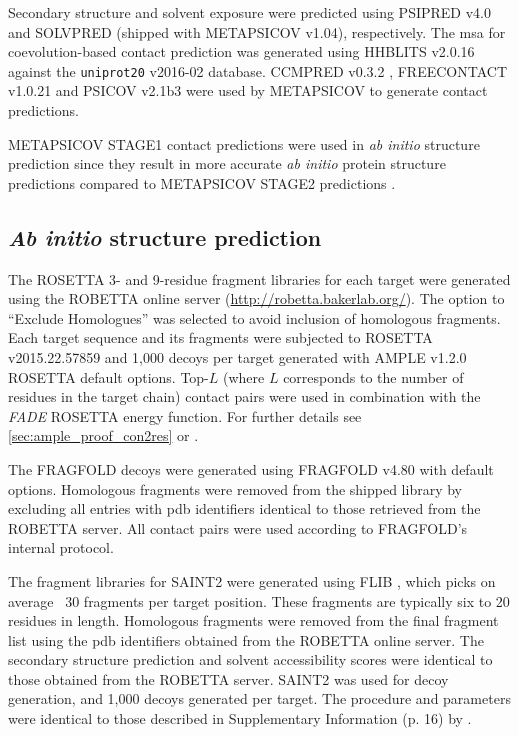 Secondary structure and solvent exposure were predicted using PSIPRED v4.0 \cite{Jones1999-ed} and SOLVPRED (shipped with METAPSICOV v1.04), respectively. The \gls{msa} for coevolution-based contact prediction was generated using HHBLITS v2.0.16 \cite{Remmert2011-kt} against the \texttt{uniprot20} v2016-02 database. CCMPRED v0.3.2 \cite{Seemayer2014-zp}, FREECONTACT v1.0.21 \cite{Kajan2014-bx} and PSICOV v2.1b3 \cite{Jones2012-ks} were used by METAPSICOV to generate contact predictions.

METAPSICOV STAGE1 contact predictions were used in \textit{ab initio} structure prediction since they result in more accurate \textit{ab initio} protein structure predictions compared to METAPSICOV STAGE2 predictions \cite{Jones2015-vq}.

\subsection{\textit{Ab initio} structure prediction} \label{sec:ample_saint2_modelling}
The ROSETTA 3- and 9-residue fragment libraries for each target were generated using the ROBETTA online server (\url{http://robetta.bakerlab.org/}). The option to ``Exclude Homologues'' was selected to avoid inclusion of homologous fragments. Each target sequence and its fragments were subjected to ROSETTA v2015.22.57859 \cite{Rohl2004-dj} and 1,000 decoys per target generated with AMPLE v1.2.0 ROSETTA default options. Top-$L$ (where $L$ corresponds to the number of residues in the target chain) contact pairs were used in combination with the \textit{FADE} ROSETTA energy function. For further details see \cref{sec:ample_proof_con2res} or \textcite{Michel2014-eg}.

The FRAGFOLD decoys were generated using FRAGFOLD v4.80 \cite{Jones2001-mc} with default options. Homologous fragments were removed from the shipped library  by excluding all entries with \gls{pdb} identifiers identical to those retrieved from the ROBETTA server. All contact pairs were used according to FRAGFOLD's internal protocol.

The fragment libraries for SAINT2 were generated using FLIB \cite{De_Oliveira2015-kb}, which picks on average ~30 fragments per target position. These fragments are typically six to 20 residues in length. Homologous fragments were removed from the final fragment list using the \gls{pdb} identifiers obtained from the ROBETTA online server. The secondary structure prediction and solvent accessibility scores were identical to those obtained from the ROBETTA server. SAINT2 was used for decoy generation, and 1,000 decoys generated per target. The procedure and parameters were identical to those described in Supplementary Information (p. 16) by \textcite{De_Oliveira2017-sg}.

